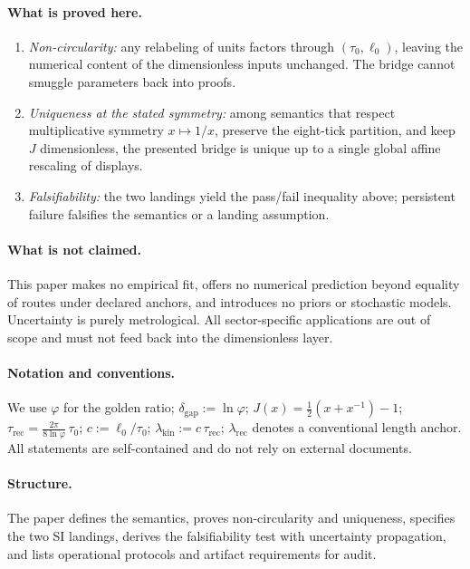 \documentclass[11pt]{article}
\theoremstyle{plain}
\theoremstyle{definition}
\theoremstyle{remark}
\begin{document}
\paragraph{What is proved here.}
\begin{enumerate}
  \item \emph{Non-circularity:} any relabeling of units factors through \((\tau_{0},\ell_{0})\), leaving the numerical content of the dimensionless inputs unchanged. The bridge cannot smuggle parameters back into proofs.
  \item \emph{Uniqueness at the stated symmetry:} among semantics that respect multiplicative symmetry \(x\mapsto 1/x\), preserve the eight-tick partition, and keep \(J\) dimensionless, the presented bridge is unique up to a single global affine rescaling of displays.
  \item \emph{Falsifiability:} the two landings yield the pass/fail inequality above; persistent failure falsifies the semantics or a landing assumption.
\end{enumerate}

\paragraph{What is not claimed.}
This paper makes no empirical fit, offers no numerical prediction beyond equality of routes under declared anchors, and introduces no priors or stochastic models. Uncertainty is purely metrological. All sector-specific applications are out of scope and must not feed back into the dimensionless layer.

\paragraph{Notation and conventions.}
We use \(\varphi\) for the golden ratio; \(\delta_{\mathrm{gap}}:=\ln\varphi\); \(J(x)=\tfrac12(x+x^{-1})-1\); \(\tau_{\mathrm{rec}}=\frac{2\pi}{8\ln\varphi}\,\tau_{0}\); \(c:=\ell_{0}/\tau_{0}\); \(\lambda_{\mathrm{kin}}:=c\,\tau_{\mathrm{rec}}\); \(\lambda_{\mathrm{rec}}\) denotes a conventional length anchor. All statements are self-contained and do not rely on external documents.

\paragraph{Structure.}
The paper defines the semantics, proves non-circularity and uniqueness, specifies the two SI landings, derives the falsifiability test with uncertainty propagation, and lists operational protocols and artifact requirements for audit.
\end{document}
